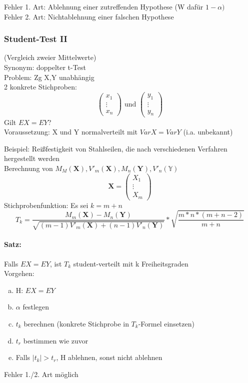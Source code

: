 \documentclass[a4paper,12pt]{scrartcl}
\begin{document}
 Fehler 1. Art: Ablehnung einer zutreffenden Hypothese (W dafür $1-\alpha)$\\
 Fehler 2. Art: Nichtablehnung einer falschen Hypothese
 
 \subsubsection{Student-Test II}
 (Vergleich zweier Mittelwerte)\\
 Synonym: doppelter t-Test\\
 Problem: Zg X,Y unabhängig\\
 2 konkrete Stichproben:
 $$\begin{pmatrix} x_1\\\vdots\\x_n \end{pmatrix} \text{ und } \begin{pmatrix}y_1\\\vdots\\y_n\end{pmatrix}$$
 Gilt $EX = EY$?\\
 Voraussetzung: X und Y normalverteilt mit $VarX=VarY$ (i.a. unbekannt)
 
 Beispiel: Reißfestigkeit von Stahlseilen, die nach verschiedenen Verfahren hergestellt werden\\
 Berechnung von $M_M(\mathbf{X}),V'_m(\mathbf{X}),M_n(\mathbf{Y}),V'_n(\mathbb{Y})$
 $$\mathbf{X}=\begin{pmatrix}
               X_1\\\vdots\\X_m
              \end{pmatrix}
 $$ 
 Stichprobenfunktion: Es sei $k=m+n$
 $$T_k = \frac{M_m(\mathbf{X})-M_n(\mathbf{Y})}{\sqrt{(m-1)V'_m(\mathbf{X})+(n-1)V'_n(\mathbf{Y})}}*\sqrt{\frac{m*n*(m+n-2)}{m+n}}$$
 
 \paragraph{Satz:} Falls $EX = EY$, ist $T_k$ student-verteilt mit k Freiheitsgraden\\
 Vorgehen:
 \begin{enumerate}[(a)]
  \item H: $EX=EY$
  \item $\alpha$ festlegen
  \item $t_k$ berechnen (konkrete Stichprobe in $T_k$-Formel einsetzen)
  \item $t_r$ bestimmen wie zuvor
  \item Falls $|t_k|>t_r$, H ablehnen, sonst nicht ablehnen
 \end{enumerate}
 Fehler 1./2. Art möglich
\end{document}
